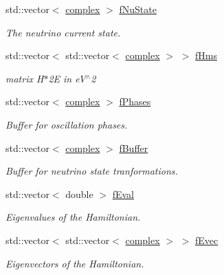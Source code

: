 \begin{DoxyCompactItemize}
std\+::vector$<$ \hyperlink{classOscProb_1_1PMNS__Base_ae86ec4718808ce9d02e5f5b4226714ab}{complex} $>$ \hyperlink{classOscProb_1_1PMNS__Base_ad38a7107c3ab393591fd5ba21658300b}{f\+Nu\+State}
\begin{DoxyCompactList}\small\item\em The neutrino current state. \end{DoxyCompactList}\item 
std\+::vector$<$ std\+::vector$<$ \hyperlink{classOscProb_1_1PMNS__Base_ae86ec4718808ce9d02e5f5b4226714ab}{complex} $>$ $>$ \hyperlink{classOscProb_1_1PMNS__Base_adf5901166216e8c7a5cff2092952f473}{f\+Hms}
\begin{DoxyCompactList}\small\item\em matrix H$\ast$2E in e\+V$^\wedge$2 \end{DoxyCompactList}\item 
std\+::vector$<$ \hyperlink{classOscProb_1_1PMNS__Base_ae86ec4718808ce9d02e5f5b4226714ab}{complex} $>$ \hyperlink{classOscProb_1_1PMNS__Base_a2fcb59d7c533e4cd963b1890e504d3dc}{f\+Phases}
\begin{DoxyCompactList}\small\item\em Buffer for oscillation phases. \end{DoxyCompactList}\item 
std\+::vector$<$ \hyperlink{classOscProb_1_1PMNS__Base_ae86ec4718808ce9d02e5f5b4226714ab}{complex} $>$ \hyperlink{classOscProb_1_1PMNS__Base_a53f912c6e4a17035a6c0c11fd63b5f14}{f\+Buffer}
\begin{DoxyCompactList}\small\item\em Buffer for neutrino state tranformations. \end{DoxyCompactList}\item 
std\+::vector$<$ double $>$ \hyperlink{classOscProb_1_1PMNS__Base_a6319c34d7decbb9d7d6da279c06e8c2d}{f\+Eval}
\begin{DoxyCompactList}\small\item\em Eigenvalues of the Hamiltonian. \end{DoxyCompactList}\item 
std\+::vector$<$ std\+::vector$<$ \hyperlink{classOscProb_1_1PMNS__Base_ae86ec4718808ce9d02e5f5b4226714ab}{complex} $>$ $>$ \hyperlink{classOscProb_1_1PMNS__Base_a093e7bd31d4ef52ed52df414e12c1d17}{f\+Evec}
\begin{DoxyCompactList}\small\item\em Eigenvectors of the Hamiltonian. \end{DoxyCompactList}\item 

\end{DoxyCompactItemize}
